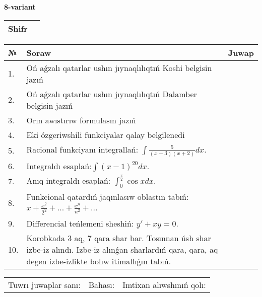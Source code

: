 \documentclass{article}
\begin{document}
  \egroup
  
  \newpage
  
  
  \textbf{8-variant}\\
  
  \bgroup
  \def\arraystretch{1.6} %
  
  \begin{tabular}{|m{5.7cm}|m{9.5cm}|}
  \hline
  Shifr & \\
  \hline
  \end{tabular}
  
  \vspace{1cm}
  
  \begin{tabular}{|m{0.7cm}|m{10cm}|m{4cm}|}
  \hline
  № & Soraw & Juwap \\
  \hline
  1. & Oń aǵzalı qatarlar ushın jıynaqlılıqtıń Koshi belgisin jazıń &  \\
  \hline
  2. & Oń aǵzalı qatarlar ushın jıynaqlılıqtıń Dalamber belgisin jazıń &  \\
  \hline
  3. & Orın awıstırıw formulasın jazıń &  \\
  \hline
  4. & Eki ózgeriwshili funkciyalar qalay belgilenedi &  \\
  \hline
  5. & Racional funkciyanı integrallań: \(\int{\frac{5}{(x - 3)(x + 2)}dx}\). &  \\
  \hline
  6. & Integraldı esaplań:\(\int{(x - 1)^{20}}dx\). &  \\
  \hline
  7. & Anıq integraldı esaplań: \(\int_{0}^{\frac{\pi}{2}}{\cos xdx}\). &  \\
  \hline
  8. & Funkcional qatardıń jaqınlasıw oblastın tabıń: \(x + \frac{x^2 }{2^2 } + ... + \frac{x^{n}}{n^2 } + ...\) &  \\
  \hline
  9. & Differencial teńlemeni sheshiń: \(y' + xy = 0\). &  \\
  \hline
  10. & Korobkada 3 aq, 7 qara shar bar. Tosınnan úsh shar izbe-iz alındı. Izbe-iz alınǵan sharlardıń qara, qara, aq degen izbe-izlikte bolıw itimallıǵın tabıń. &  \\
  \hline
  \end{tabular}
  
  \vspace{1cm}
  
  \begin{tabular}{lll}
  Tuwrı juwaplar sanı: \underline{\hspace{1.5cm}} & 
  Bahası: \underline{\hspace{1.5cm}} & 
  Imtixan alıwshınıń qolı: \underline{\hspace{2cm}} \\
  \end{tabular}
  
\end{document}
